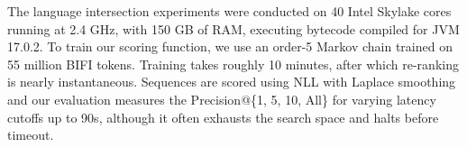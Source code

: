 \documentclass[runningheads]{llncs}
\begin{document}
  The language intersection experiments were conducted on 40 Intel Skylake cores running at 2.4 GHz, with 150 GB of RAM, executing bytecode compiled for JVM 17.0.2. To train our scoring function, we use an order-5 Markov chain trained on 55 million BIFI tokens. Training takes roughly 10 minutes, after which re-ranking is nearly instantaneous. Sequences are scored using NLL with Laplace smoothing and our evaluation measures the Precision@\{1, 5, 10, All\} for varying latency cutoffs up to 90s, although it often exhausts the search space and halts before timeout.


\end{document}
